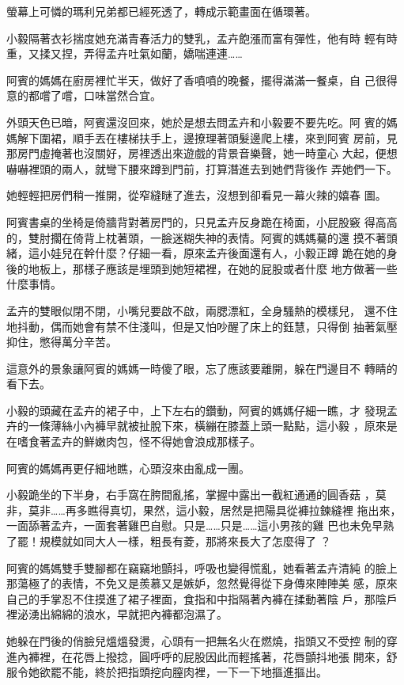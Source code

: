 螢幕上可憐的瑪利兄弟都已經死透了，轉成示範畫面在循環著。

小毅隔著衣衫揣度她充滿青春活力的雙乳，孟卉飽漲而富有彈性，他有時
輕有時重，又揉又捏，弄得孟卉吐氣如蘭，嬌喘連連……

阿賓的媽媽在廚房裡忙半天，做好了香噴噴的晚餐，擺得滿滿一餐桌，自
己很得意的都嚐了嚐，口味當然合宜。

外頭天色已暗，阿賓還沒回來，她於是想去問孟卉和小毅要不要先吃。阿
賓的媽媽解下圍裙，順手丟在樓梯扶手上，邊撩理著頭髮邊爬上樓，來到阿賓
房前，見那房門虛掩著也沒關好，房裡透出來遊戲的背景音樂聲，她一時童心
大起，便想嚇嚇裡頭的兩人，就彎下腰來蹲到門前，打算潛進去到她們背後作
弄她們一下。

她輕輕把房們稍一推開，從窄縫瞇了進去，沒想到卻看見一幕火辣的嬉春
圖。

阿賓書桌的坐椅是倚牆背對著房門的，只見孟卉反身跪在椅面，小屁股竅
得高高的，雙肘擱在倚背上枕著頭，一臉迷糊失神的表情。阿賓的媽媽驀的還
摸不著頭緒，這小娃兒在幹什麼？仔細一看，原來孟卉後面還有人，小毅正蹲
跪在她的身後的地板上，那樣子應該是埋頭到她短裙裡，在她的屁股或者什麼
地方做著一些什麼事情。

孟卉的雙眼似閉不閉，小嘴兒要啟不啟，兩腮漂紅，全身騷熱的模樣兒，
還不住地抖動，偶而她會有禁不住淺叫，但是又怕吵醒了床上的鈺慧，只得倒
抽著氣壓抑住，憋得萬分辛苦。

這意外的景象讓阿賓的媽媽一時傻了眼，忘了應該要離開，躲在門邊目不
轉睛的看下去。

小毅的頭藏在孟卉的裙子中，上下左右的鑽動，阿賓的媽媽仔細一瞧，才
發現孟卉的一條薄絲小內褲早就被扯脫下來，橫繃在膝蓋上頭一點點，這小毅
，原來是在嗜食著孟卉的鮮嫩肉包，怪不得她會浪成那樣子。

阿賓的媽媽再更仔細地瞧，心頭沒來由亂成一團。

小毅跪坐的下半身，右手窩在胯間亂搖，掌握中露出一截紅通通的圓香菇
，莫非，莫非……再多瞧得真切，果然，這小毅，居然是把陽具從褲拉鍊縫裡
拖出來，一面舔著孟卉，一面套著雞巴自慰。只是……只是……這小男孩的雞
巴也未免早熟了罷！規模就如同大人一樣，粗長有菱，那將來長大了怎麼得了
？

阿賓的媽媽雙手雙腳都在竊竊地顫抖，呼吸也變得慌亂，她看著孟卉清純
的臉上那蕩極了的表情，不免又是羨慕又是嫉妒，忽然覺得從下身傳來陣陣美
感，原來自己的手掌忍不住摸進了裙子裡面，食指和中指隔著內褲在揉動著陰
戶，那陰戶裡泌湧出綿綿的浪水，早就把內褲都泡濕了。

她躲在門後的俏臉兒熅熅發燙，心頭有一把無名火在燃燒，指頭又不受控
制的穿進內褲裡，在花唇上撥捻，圓呼呼的屁股因此而輕搖著，花唇顫抖地張
開來，舒服令她欲罷不能，終於把指頭挖向膣肉裡，一下一下地摳進摳出。

